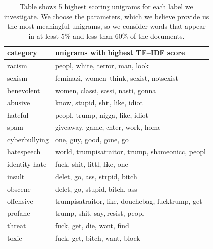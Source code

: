 \documentclass[fleqn,moreauthors,10pt]{ds_report}
\begin{document}
\begin{table}[htb]
\scriptsize
\centering
\begin{tabular}{l|l}
\toprule
\textbf{category}   & \textbf{unigrams with highest TF--IDF score} \\ \midrule
racism     & peopl, white, terror, man, look                \\ \hline
sexism     & feminazi, women, think, sexist, notsexist                \\ \hline
benevolent & women, classi, sassi, nasti, gonna            \\ \hline
abusive    & know, stupid, shit, like, idiot  \\ \hline
hateful    & peopl, trump, nigga, like, idiot    \\ \hline
spam       & giveaway, game, enter, work, home            \\ \hline
cyberbullying       & one, guy, good, gone, go             \\ \hline
hatespeech      & world, trumpisatraitor, trump, shameonicc, peopl             \\ \hline
identity hate       & fuck, shit, littl, like, one             \\ \hline
insult       & delet, go, ass, stupid, bitch        \\ \hline
obscene       & delet, go, stupid, bitch, ass             \\ \hline
offensive       & trumpisatraitor, like, douchebag, fucktrump, get            \\ \hline
profane       & trump, shit, say, resist, peopl             \\ \hline
threat       & fuck, get, die, want, find           \\ \hline
toxic       & fuck, get, bitch, want, block             \\ \bottomrule
\end{tabular}
\caption{Table shows 5 highest scoring unigrams for each label we investigate. We choose the parameters, which we believe provide us the most meaningful unigrams, so we consider words that appear in at least $5\%$ and less than $60\%$ of the documents.}
\label{tab:tf-idf}
\end{table}

\end{document}
